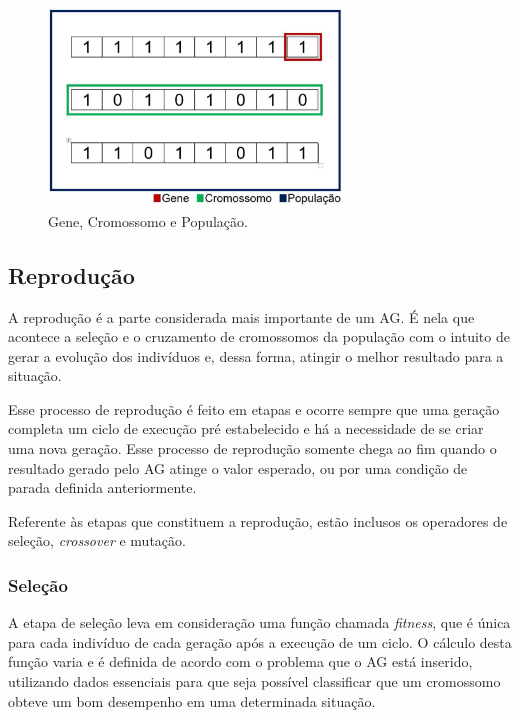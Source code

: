 \begin{figure}[htb]
        \centering
        \caption{\label{fig_gene}Gene, Cromossomo e População.}
        \includegraphics[width=0.7\textwidth]{images/gene.jpg}
\end{figure}

\subsection{Reprodu{\c c}{\~a}o}

A reprodução é a parte considerada mais importante de um AG. É
nela que acontece a seleção e o cruzamento de cromossomos da
população com o intuito de gerar a evolução dos indivíduos e,
dessa forma, atingir o melhor resultado para a situação. 

Esse processo de reprodução é feito em etapas e ocorre sempre
que uma geração completa um ciclo de execução pré estabelecido
e há a necessidade de se criar uma nova geração. Esse processo
de reprodução somente chega ao fim quando o resultado gerado
pelo AG atinge o valor esperado, ou por uma condição de parada
definida anteriormente. 

Referente às etapas que constituem a reprodução, estão
inclusos os operadores de seleção, \textit{crossover} e
mutação.

\subsubsection{Sele{\c c}{\~a}o}

A etapa de seleção leva em consideração uma função chamada
\textit{fitness}, que é única para cada indivíduo de cada
geração após a execução de um ciclo. O cálculo desta função
varia e é definida de acordo com o problema que o AG está
inserido, utilizando dados essenciais para que seja possível
classificar que um cromossomo obteve um bom desempenho em uma
determinada situação. 

